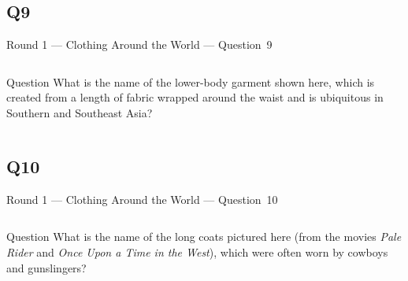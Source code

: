 \documentclass[11pt]{beamer}
\begin{document}
\subsection*{Q9}
\begin{frame}[t]{Round 1 --- Clothing Around the World --- \mbox{Question 9}}
\vspace{-0.5em}
\begin{columns}[T,totalwidth=\linewidth]
\begin{column}{0.37\linewidth}
\begin{block}{Question}
What is the name of the lower-body garment shown here, which is created from a length of fabric wrapped around the waist and is ubiquitous in Southern and Southeast Asia?
\end{block}
\end{column}
\begin{column}{0.62\linewidth}
\begin{center}
\texttt{[image: \{Images/sarong]}.jpg}
\end{center}
\end{column}
\end{columns}
\end{frame}
\subsection*{Q10}
\begin{frame}[t]{Round 1 --- Clothing Around the World --- \mbox{Question 10}}
\vspace{-0.5em}
\begin{columns}[T,totalwidth=\linewidth]
\begin{column}{0.37\linewidth}
\begin{block}{Question}
What is the name of the long coats pictured here (from the movies \emph{Pale Rider} and \emph{Once Upon a Time in the West}), which were often worn by cowboys and gunslingers?
\end{block}
\end{column}
\begin{column}{0.62\linewidth}
\begin{center}
\texttt{[image: \{Images/duster]}.jpg}
\end{center}
\end{column}
\end{columns}
\end{frame}
\end{document}
